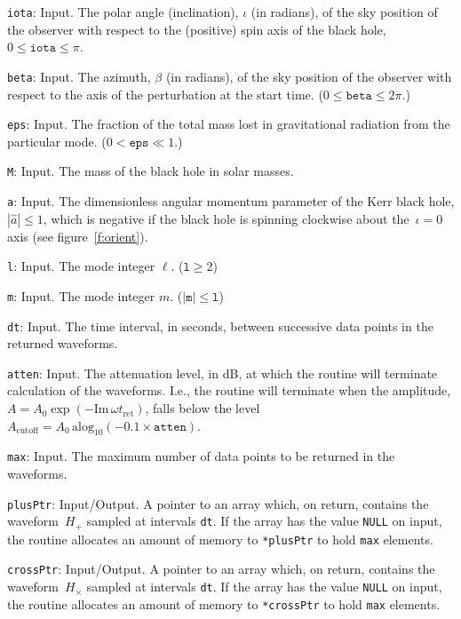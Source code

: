 \begin{description}
\item{\texttt{iota}}: Input.  The polar angle (inclination), $\iota$
  (in radians), of
  the sky position of the observer with respect to the (positive) spin axis
  of the black hole, $0\le\texttt{iota}\le\pi$.
\item{\texttt{beta}}: Input.  The azimuth, $\beta$ (in radians),
  of the sky position
  of the observer with respect to the axis of the perturbation at the start
  time.  ($0\le\texttt{beta}\le2\pi$.)
\item{\texttt{eps}}: Input.  The fraction of the total mass lost
  in gravitational radiation from the particular mode. ($0<\texttt{eps}\ll1$.)
\item{\texttt{M}}: Input.  The mass of the black hole in solar masses.
\item{\texttt{a}}: Input.  The dimensionless angular momentum parameter
  of the Kerr black hole, $|\hat{a}|\le1$, which is negative if the black hole
  is spinning clockwise about the~$\iota=0$ axis (see figure~\ref{f:orient}).
\item{\texttt{l}}: Input.  The mode integer $\ell$.  ($\texttt{l}\ge2$)
\item{\texttt{m}}: Input.  The mode integer $m$.  ($|\texttt{m}|\le\texttt{l}$)
\item{\texttt{dt}}: Input.  The time interval, in seconds, between successive
  data points in the returned waveforms.
\item{\texttt{atten}}: Input.  The attenuation level, in dB, at which the
  routine will terminate calculation of the waveforms.  I.e., the routine
  will terminate when the amplitude,
  $A=A_0\exp(-{\mathrm{Im}}\,\omega t_{\mathrm{\scriptstyle ret}})$, falls below
  the level~$A_{\mathrm{\scriptstyle cutoff}}=A_0\,{\mathrm{alog}}_{10}(-0.1\times
  \texttt{atten})$.
\item{\texttt{max}}: Input.  The maximum number of data points to be returned
  in the waveforms.
\item{\texttt{plusPtr}}: Input/Output.  A pointer to an array which, on
  return, contains the waveform~$H_+$ sampled at intervals \texttt{dt}.
  If the array has the value \texttt{NULL} on input, the routine allocates
  an amount of memory to \texttt{*plusPtr} to hold \texttt{max} elements.
\item{\texttt{crossPtr}}: Input/Output.  A pointer to an array which, on
  return, contains the waveform~$H_\times$ sampled at intervals \texttt{dt}.
  If the array has the value \texttt{NULL} on input, the routine allocates
  an amount of memory to \texttt{*crossPtr} to hold \texttt{max} elements.
\end{description}


